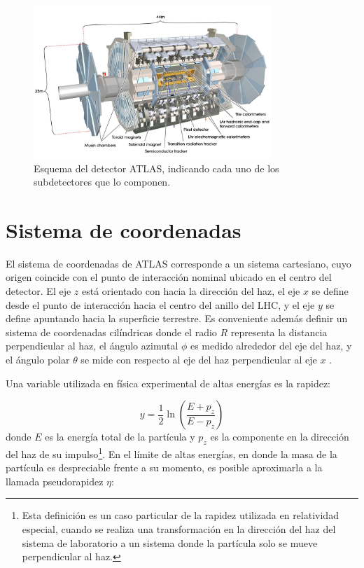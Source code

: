 \begin{figure}
\centering
  \includegraphics[width=0.8\textwidth]{images/atlas_1.jpg}
  \caption{Esquema del detector ATLAS, indicando cada uno de los subdetectores que lo componen.}
  \label{atlas_1}
\end{figure}

\section{Sistema de coordenadas}

El sistema de coordenadas de ATLAS corresponde a un sistema cartesiano, cuyo origen coincide con el punto de interacción nominal ubicado en el centro del detector. El eje $z$ está orientado con hacia la dirección del haz, el eje $x$ se define desde el punto de interacción hacia el centro del anillo del LHC, y el eje $y$ se define apuntando hacia la superficie terrestre. Es conveniente además definir un sistema de coordenadas cilíndricas donde el radio $R$ representa la distancia perpendicular al haz, el ángulo azimutal $\phi$ es medido alrededor del eje del haz, y el ángulo polar $\theta$ se mide con respecto al eje del haz perpendicular al eje $x$ . 

Una variable utilizada en física experimental de altas energías es la rapidez:

\begin{equation}
y=\frac{1}{2}\ln\left( \frac{E+p_{z}}{E-p_{z}}\right)
\end{equation}
%
donde $E$ es la energía total de la partícula y $p_{z}$ es la componente en la dirección del haz de su impulso\footnote{Esta definición es un caso particular de la rapidez utilizada en relatividad especial, cuando se realiza una transformación en la dirección del haz del sistema de laboratorio a un sistema donde la partícula solo se mueve perpendicular al haz.}. En el límite de altas energías, en donde la masa de la partícula es despreciable frente a su momento, es posible aproximarla a la llamada pseudorapidez $\eta$:

